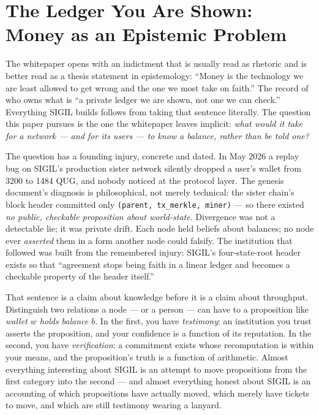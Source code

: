 \documentclass[10pt,a4paper]{article}
\begin{document}
\section{The Ledger You Are Shown: Money as an Epistemic Problem}\label{sec:ledger}

The whitepaper opens with an indictment that is usually read as rhetoric and is
better read as a thesis statement in epistemology: ``Money is the technology we are
least allowed to get wrong and the one we most take on faith.'' The record of who
owns what is ``a private ledger we are shown, not one we can check.'' Everything
SIGIL builds follows from taking that sentence literally. The question this paper
pursues is the one the whitepaper leaves implicit: \emph{what would it take for a
network — and for its users — to know a balance, rather than be told one?}

The question has a founding injury, concrete and dated. In May 2026 a replay bug on
SIGIL's production sister network silently dropped a user's wallet from 3200 to 1484
QUG, and nobody noticed at the protocol layer. The genesis document's diagnosis is
philosophical, not merely technical: the sister chain's block header committed only
\texttt{(parent, tx\_merkle, miner)} — so there existed \emph{no public, checkable
proposition about world-state}. Divergence was not a detectable lie; it was private
drift. Each node held beliefs about balances; no node ever \emph{asserted} them in a
form another node could falsify. The institution that followed was built from the
remembered injury: SIGIL's four-state-root header exists so that ``agreement stops
being faith in a linear ledger and becomes a checkable property of the header
itself.''

That sentence is a claim about knowledge before it is a claim about throughput.
Distinguish two relations a node — or a person — can have to a proposition like
\emph{wallet $w$ holds balance $b$}. In the first, you have \emph{testimony}: an
institution you trust asserts the proposition, and your confidence is a function of
its reputation. In the second, you have \emph{verification}: a commitment exists
whose recomputation is within your means, and the proposition's truth is a function
of arithmetic. Almost everything interesting about SIGIL is an attempt to move
propositions from the first category into the second — and almost everything honest
about SIGIL is an accounting of which propositions have actually moved, which
merely have tickets to move, and which are still testimony wearing a lanyard.
\end{document}
